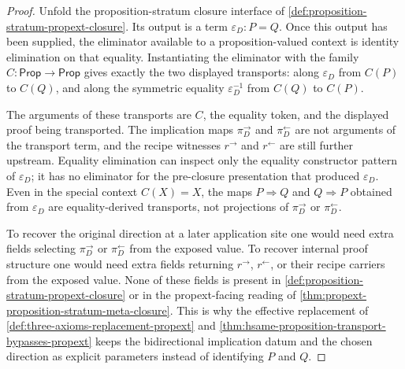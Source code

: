 \begin{proof}
Unfold the proposition-stratum closure interface of \autoref{def:proposition-stratum-propext-closure}. Its output is a term $\varepsilon_D:P=Q$. Once this output has been supplied, the eliminator available to a proposition-valued context is identity elimination on that equality. Instantiating the eliminator with the family $C:\mathsf{Prop}\to\mathsf{Prop}$ gives exactly the two displayed transports: along $\varepsilon_D$ from $C(P)$ to $C(Q)$, and along the symmetric equality $\varepsilon_D^{-1}$ from $C(Q)$ to $C(P)$.

The arguments of these transports are $C$, the equality token, and the displayed proof being transported. The implication maps $\pi^{\rightarrow}_D$ and $\pi^{\leftarrow}_D$ are not arguments of the transport term, and the recipe witnesses $r^{\rightarrow}$ and $r^{\leftarrow}$ are still further upstream. Equality elimination can inspect only the equality constructor pattern of $\varepsilon_D$; it has no eliminator for the pre-closure presentation that produced $\varepsilon_D$. Even in the special context $C(X)=X$, the maps $P\Rightarrow Q$ and $Q\Rightarrow P$ obtained from $\varepsilon_D$ are equality-derived transports, not projections of $\pi^{\rightarrow}_D$ or $\pi^{\leftarrow}_D$.

To recover the original direction at a later application site one would need extra fields selecting $\pi^{\rightarrow}_D$ or $\pi^{\leftarrow}_D$ from the exposed value. To recover internal proof structure one would need extra fields returning $r^{\rightarrow}$, $r^{\leftarrow}$, or their recipe carriers from the exposed value. None of these fields is present in \autoref{def:proposition-stratum-propext-closure} or in the propext-facing reading of \autoref{thm:propext-proposition-stratum-meta-closure}. This is why the effective replacement of \autoref{def:three-axioms-replacement-propext} and \autoref{thm:hsame-proposition-transport-bypasses-propext} keeps the bidirectional implication datum and the chosen direction as explicit parameters instead of identifying $P$ and $Q$.
\end{proof}
